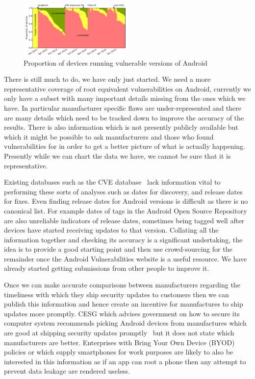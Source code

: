 \documentclass[a4paper,twocolumn]{article}
\begin{document}
\begin{figure}
 \includegraphics[width=0.5\textwidth]{figures/proportioninsecure.pdf}
 \caption{Proportion of devices running vulnerable versions of Android}
 \label{fig:propinsecure}
\end{figure}

There is still much to do, we have only just started.
We need a more representative coverage of root equivalent vulnerabilities on Android, currently we only have a subset with many important details missing from the ones which we have.
In particular manufacturer specific flaws are under-represented and there are many details which need to be tracked down to improve the accuracy of the results.
There is also information which is not presently publicly available but which it might be possible to ask manufacturers and those who found vulnerabilities for in order to get a better picture of what is actually happening.
Presently while we can chart the data we have, we cannot be sure that it is representative.

Existing databases such as the CVE database~\cite{cve-details} lack information vital to performing these sorts of analyses such as dates for discovery, and release dates for fixes.
Even finding release dates for Android versions is difficult as there is no canonical list.
For example dates of tags in the Android Open Source Repository are also unreliable indicators of release dates, sometimes being tagged well after devices have started receiving updates to that version.
Collating all the information together and checking its accuracy is a significant undertaking, the idea is to provide a good starting point and then use crowd-sourcing for the remainder once the Android Vulnerabilities website is a useful resource.
We have already started getting submissions from other people to improve it.

Once we can make accurate comparisons between manufacturers regarding the timeliness with which they ship security updates to customers then we can publish this information and hence create an incentive for manufactures to ship updates more promptly.
CESG which advises government on how to secure its computer system recommends picking Android devices from manufactures which are good at shipping security updates promptly~\cite{TODO} but it does not state which manufacturers are better.
Enterprises with Bring Your Own Device (BYOD) policies or which supply smartphones for work purposes are likely to also be interested in this information as if an app can root a phone then any attempt to prevent data leakage are rendered useless.
\end{document}
